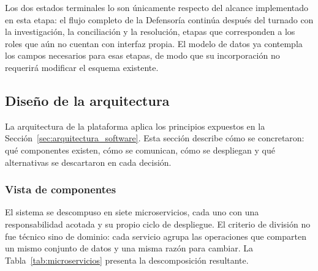 	Los dos estados terminales lo son únicamente respecto del alcance implementado en esta etapa:
	el flujo completo de la Defensoría continúa después del turnado con la investigación, la
	conciliación y la resolución, etapas que corresponden a los roles que aún no cuentan con
	interfaz propia. El modelo de datos ya contempla los campos necesarios para esas etapas, de modo
	que su incorporación no requerirá modificar el esquema existente.
	
	\subsection{Diseño de la arquitectura}
	\label{sec:diseno_arquitectura}
	La arquitectura de la plataforma aplica los principios expuestos en la
	Sección~\ref{sec:arquitectura_software}. Esta sección describe cómo se concretaron: qué
	componentes existen, cómo se comunican, cómo se despliegan y qué alternativas se descartaron en
	cada decisión.
	
	\subsubsection{Vista de componentes}
	El sistema se descompuso en siete microservicios, cada uno con una responsabilidad acotada y su
	propio ciclo de despliegue. El criterio de división no fue técnico sino de dominio: cada
	servicio agrupa las operaciones que comparten un mismo conjunto de datos y una misma razón para
	cambiar. La Tabla~\ref{tab:microservicios} presenta la descomposición resultante.
	
	
	\small
	\renewcommand{\arraystretch}{1.25}
	\setlength{\tabcolsep}{4pt}
	
